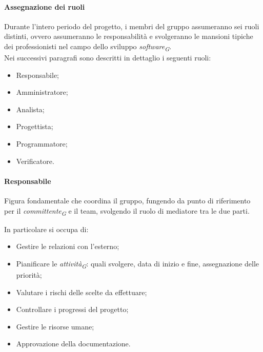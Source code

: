 \paragraph{Assegnazione dei ruoli}

Durante l'intero periodo del progetto, i membri del gruppo assumeranno sei ruoli distinti, ovvero assumeranno le responsabilità e svolgeranno le mansioni tipiche dei professionisti nel campo dello sviluppo \textit{software}\textsubscript{\textit{G}}. \\
Nei successivi paragrafi sono descritti in dettaglio i seguenti ruoli:
\begin{itemize}
	\item Responsabile;
	\item Amministratore;
	\item Analista;
	\item Progettista;
	\item Programmatore;
	\item Verificatore.
\end{itemize}

\paragraph{Responsabile}\label{responsabile} Figura fondamentale che coordina il gruppo, fungendo da punto di riferimento per il \textit{committente}\textsubscript{\textit{G}} e il team, svolgendo il ruolo di mediatore tra le due parti.

In particolare si occupa di:
\begin{itemize}
	\item Gestire le relazioni con l'esterno;
	\item Pianificare le \textit{attività}\textsubscript{\textit{G}}: quali svolgere, data di inizio e fine, assegnazione delle priorità;
	\item Valutare i rischi delle scelte da effettuare;
	\item Controllare i progressi del progetto;
	\item Gestire le risorse umane;
	\item Approvazione della documentazione.
\end{itemize}

